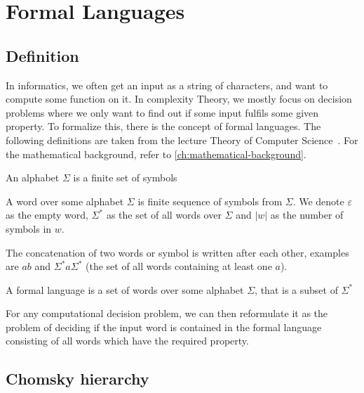 \chapter{Formal Languages}\label{ch:formal-languages}


\section{Definition}\label{sec:definition}

In informatics, we often get an input as a string of characters, and want to compute some function on it.
In complexity Theory, we mostly focus on decision problems where we only want to find out if some input fulfils some given property.
To formalize this, there is the concept of formal languages.
The following definitions are taken from the lecture Theory of Computer Science~\cite{theory-cs}.
For the mathematical background, refer to \autoref{ch:mathematical-background}.

\begin{define}[Alphabet]
    An alphabet $\Sigma$ is a finite set of symbols
\end{define}

\begin{define}[Word]
    A word over some alphabet $\Sigma$ is finite sequence of symbols from $\Sigma$.
    We denote $\varepsilon$ as the empty word, $\Sigma^*$ as the set of all words over $\Sigma$ and $|w|$ as the number of symbols in $w$.
\end{define}

The concatenation of two words or symbol is written after each other, examples are $ab$ and $\Sigma^*a\Sigma^*$ (the set of all words containing at least one $a$).

\begin{define}
    A formal language is a set of words over some alphabet $\Sigma$, that is a subset of $\Sigma^*$
\end{define}

For any computational decision problem, we can then reformulate it as the problem of deciding if the input word is contained in the formal language consisting of all words which have the required property.


\section{Chomsky hierarchy}\label{sec:chromsky-hierarchy}

